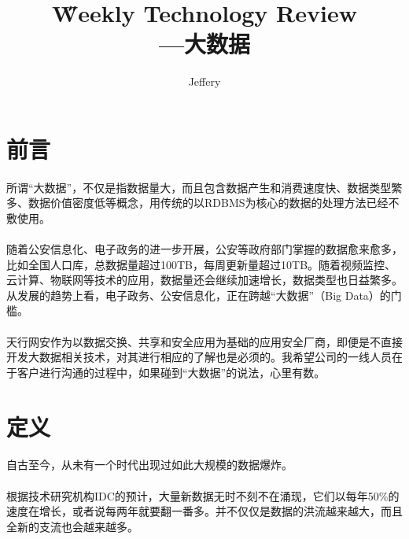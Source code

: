 \documentclass[12pt]{article}
\title{\H Weekly Technology Review\\[2ex]---大数据}
\author{Jeffery}
\begin{document}
\maketitle

\newpage

\tableofcontents
\newpage

\section{前言}
\paragraph{}
所谓“大数据”，不仅是指数据量大，而且包含数据产生和消费速度快、数据类型繁多、数据价值密度低等概念，用传统的以RDBMS为核心的数据的处理方法已经不敷使用。

\paragraph{}
随着公安信息化、电子政务的进一步开展，公安等政府部门掌握的数据愈来愈多，比如全国人口库，总数据量超过100TB，每周更新量超过10TB。随着视频监控、云计算、物联网等技术的应用，数据量还会继续加速增长，数据类型也日益繁多。从发展的趋势上看，电子政务、公安信息化，正在跨越“大数据”（Big Data）的门槛。

\paragraph{}
天行网安作为以数据交换、共享和安全应用为基础的应用安全厂商，即便是不直接开发大数据相关技术，对其进行相应的了解也是必须的。我希望公司的一线人员在于客户进行沟通的过程中，如果碰到“大数据”的说法，心里有数。

\newpage

\section{定义}
\paragraph{}
自古至今，从未有一个时代出现过如此大规模的数据爆炸。

\paragraph{}
根据技术研究机构IDC的预计，大量新数据无时不刻不在涌现，它们以每年50\%的速度在增长，或者说每两年就要翻一番多。并不仅仅是数据的洪流越来越大，而且全新的支流也会越来越多。
\end{document}
